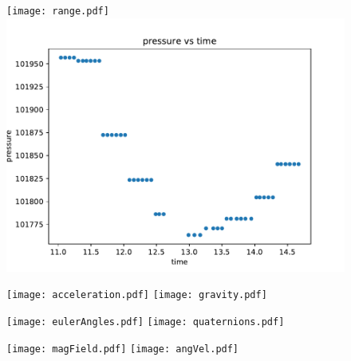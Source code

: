 \documentclass{article}
\begin{document}
\begin{figure}[h!]
\begin{multicols}{2}
    \texttt{[image: range.pdf]}
        \includegraphics[scale=0.6]{pressure.pdf}
\end{multicols}

\begin{multicols}{2}
    \texttt{[image: acceleration.pdf]}
    \texttt{[image: gravity.pdf]}
\end{multicols}

\end{figure}

\newpage
\begin{figure}[h!]

\begin{multicols}{2}
    \texttt{[image: eulerAngles.pdf]}
    \texttt{[image: quaternions.pdf]}
\end{multicols}

\begin{multicols}{2}
    \texttt{[image: magField.pdf]}
    \texttt{[image: angVel.pdf]}
\end{multicols}


\end{figure}
\end{document}
